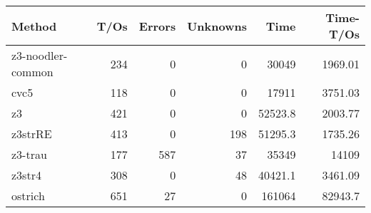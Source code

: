 \begin{tabular}{lrrrrr}
\hline
 Method            &   T/Os &   Errors &   Unknowns &     Time &   Time-T/Os \\
\hline
 z3-noodler-common &    234 &        0 &          0 &  30049   &     1969.01 \\
 cvc5              &    118 &        0 &          0 &  17911   &     3751.03 \\
 z3                &    421 &        0 &          0 &  52523.8 &     2003.77 \\
 z3strRE           &    413 &        0 &        198 &  51295.3 &     1735.26 \\
 z3-trau           &    177 &      587 &         37 &  35349   &    14109    \\
 z3str4            &    308 &        0 &         48 &  40421.1 &     3461.09 \\
 ostrich           &    651 &       27 &          0 & 161064   &    82943.7  \\
\hline
\end{tabular}
